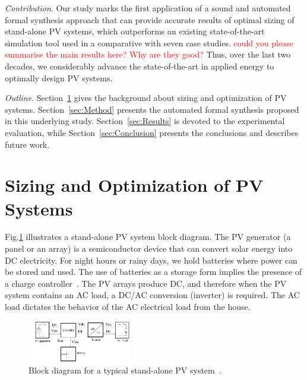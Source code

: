 \documentclass[journal]{IEEEtran}
\begin{document}
\textit{Contribution}. Our study marks the first application of a sound and automated formal synthesis approach that can provide accurate results of optimal sizing of stand-alone PV systems, which outperforms an existing state-of-the-art simulation tool used in a comparative with seven case studies. \textcolor{red}{could you please summarise the main results here? Why are they good?} Thus, over the last two decades, we considerably advance the state-of-the-art in applied energy to optimally design PV systems.

\textit{Outline}. Section~\ref{sec:Background} gives the background about sizing and optimization of PV systems. Section~\ref{sec:Method} presents the automated formal synthesis proposed in this underlying study. Section~\ref{sec:Results} is devoted to the experimental evaluation, while Section~\ref{sec:Conclusion} presents the conclusions and describes future work.

\section{Sizing and Optimization of PV Systems}
\label{sec:Background}

Fig.\ref{fig:blockdiagram} illustrates a stand-alone PV system block diagram. The PV generator (a panel or an array) is a semiconductor device that can convert solar energy into DC electricity. For night hours or rainy days, we hold batteries where power can be stored and used. The use of batteries as a storage form implies the presence of a charge controller~\cite{Hansen}. The PV arrays produce DC, and therefore when the PV system contains an AC load, a DC/AC conversion (inverter) is required. The AC load dictates the behavior of the AC electrical load from the house.
%
\begin{figure}[h]
\includegraphics[width=0.4\textwidth]{blockdiagramPVS2_rev}
\centering
\caption{Block diagram for a typical stand-alone PV system~\cite{Hansen}.}
\label{fig:blockdiagram} 
\end{figure}
\end{document}
